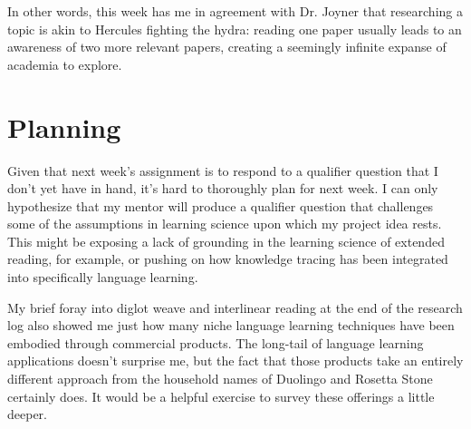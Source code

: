\documentclass[
	letterpaper, %
]{jdf}
\begin{document}
In other words, this week has me in agreement with Dr. Joyner that researching a topic is akin to Hercules fighting the hydra: reading one paper usually leads to an awareness of two more relevant papers, creating a seemingly infinite expanse of academia to explore.

\section{Planning}
Given that next week's assignment is to respond to a qualifier question that I don't yet have in hand, it's hard to thoroughly plan for next week. I can only hypothesize that my mentor will produce a qualifier question that challenges some of the assumptions in learning science upon which my project idea rests. This might be exposing a lack of grounding in the learning science of extended reading, for example, or pushing on how knowledge tracing has been integrated into specifically language learning.

My brief foray into diglot weave and interlinear reading at the end of the research log also showed me just how many niche language learning techniques have been embodied through commercial products. The long-tail of language learning applications doesn't surprise me, but the fact that those products take an entirely different approach from the household names of Duolingo and Rosetta Stone certainly does. It would be a helpful exercise to survey these offerings a little deeper. 


\printbibliography{}
\end{document}
